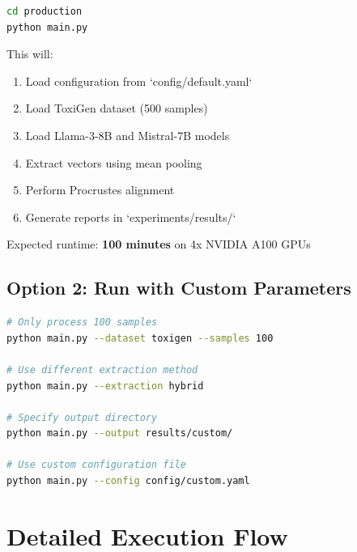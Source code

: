 \documentclass[12pt,a4paper,oneside]{report}
\begin{document}
\begin{lstlisting}[language=Bash]
cd production
python main.py
\end{lstlisting}

This will:
\begin{enumerate}
    \item Load configuration from `config/default.yaml`
    \item Load ToxiGen dataset (500 samples)
    \item Load Llama-3-8B and Mistral-7B models
    \item Extract vectors using mean pooling
    \item Perform Procrustes alignment
    \item Generate reports in `experiments/results/`
\end{enumerate}

Expected runtime: \textbf{100 minutes} on 4x NVIDIA A100 GPUs

\subsection{Option 2: Run with Custom Parameters}

\begin{lstlisting}[language=Bash, caption=Run with Custom Parameters]
# Only process 100 samples
python main.py --dataset toxigen --samples 100

# Use different extraction method
python main.py --extraction hybrid

# Specify output directory
python main.py --output results/custom/

# Use custom configuration file
python main.py --config config/custom.yaml
\end{lstlisting}

\section{Detailed Execution Flow}
\end{document}
